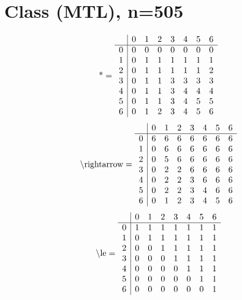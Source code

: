 \documentclass[11pt]{article}
\begin{document}
\section{Class (MTL), n=505}
\[\text{*} = 
\begin{array}{r | r r r r r r r}
 & 0 & 1 & 2 & 3 & 4 & 5 & 6 \\ \hline
0 & 0 & 0 & 0 & 0 & 0 & 0 & 0 \\
1 & 0 & 1 & 1 & 1 & 1 & 1 & 1 \\
2 & 0 & 1 & 1 & 1 & 1 & 1 & 2 \\
3 & 0 & 1 & 1 & 3 & 3 & 3 & 3 \\
4 & 0 & 1 & 1 & 3 & 4 & 4 & 4 \\
5 & 0 & 1 & 1 & 3 & 4 & 5 & 5 \\
6 & 0 & 1 & 2 & 3 & 4 & 5 & 6 \\
\end{array}
\]
\[\text{\textbackslash rightarrow} = 
\begin{array}{r | r r r r r r r}
 & 0 & 1 & 2 & 3 & 4 & 5 & 6 \\ \hline
0 & 6 & 6 & 6 & 6 & 6 & 6 & 6 \\
1 & 0 & 6 & 6 & 6 & 6 & 6 & 6 \\
2 & 0 & 5 & 6 & 6 & 6 & 6 & 6 \\
3 & 0 & 2 & 2 & 6 & 6 & 6 & 6 \\
4 & 0 & 2 & 2 & 3 & 6 & 6 & 6 \\
5 & 0 & 2 & 2 & 3 & 4 & 6 & 6 \\
6 & 0 & 1 & 2 & 3 & 4 & 5 & 6 \\
\end{array}
\]
\[\text{\textbackslash le} = 
\begin{array}{r | r r r r r r r}
 & 0 & 1 & 2 & 3 & 4 & 5 & 6 \\ \hline
0 & 1 & 1 & 1 & 1 & 1 & 1 & 1 \\
1 & 0 & 1 & 1 & 1 & 1 & 1 & 1 \\
2 & 0 & 0 & 1 & 1 & 1 & 1 & 1 \\
3 & 0 & 0 & 0 & 1 & 1 & 1 & 1 \\
4 & 0 & 0 & 0 & 0 & 1 & 1 & 1 \\
5 & 0 & 0 & 0 & 0 & 0 & 1 & 1 \\
6 & 0 & 0 & 0 & 0 & 0 & 0 & 1 \\
\end{array}
\]
\end{document}

